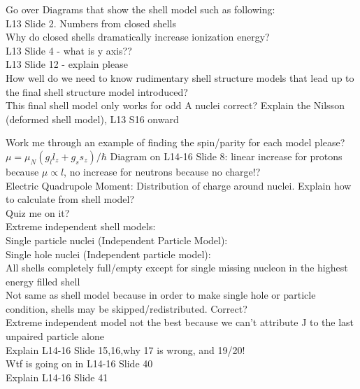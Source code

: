 \documentclass{article}
\begin{document}
\begin{multicols}{3}
Go over Diagrams that show the shell model such as following:\\
\hspace*{0.01\textwidth} L13 Slide 2.  Numbers from closed shells\\
\hspace*{0.01\textwidth} Why do closed shells dramatically increase ionization energy?\\
\hspace*{0.01\textwidth} L13 Slide 4 - what is y axis?? \\
\hspace*{0.01\textwidth} L13 Slide 12 - explain please\\
\hspace*{0.01\textwidth} How well do we need to know rudimentary shell structure models that lead up to the final shell structure model introduced?\\
\hspace*{0.01\textwidth} This final shell model only works for odd A nuclei correct?
\hspace*{0.01\textwidth} Explain the Nilsson (deformed shell model), L13 S16 onward\

Work me through an example of finding the spin/parity for each model please?\\

$\mu = \mu_{N}(g_{l}l_{z} + g_{s}s_{z}) / \hbar$
Diagram on L14-16 Slide 8: linear increase for protons because $\mu \propto l$, no increase for neutrons because no charge!?\\
Electric Quadrupole Moment: Distribution of charge around nuclei.  Explain how to calculate from shell model?\\

Quiz me on it?\\

Extreme independent shell models:\\
Single particle nuclei (Independent Particle Model):\\
\hspace*{0.01\textwidth} 
Single hole nuclei (Independent particle model):\\
\hspace*{0.01\textwidth} All shells completely full/empty except for single missing nucleon in the highest energy filled shell\\
\hspace*{0.01\textwidth} Not same as shell model because in order to make single hole or particle condition, shells may be skipped/redistributed.  Correct?\\
Extreme independent model not the best because we can't attribute J to the last unpaired particle alone\\
Explain L14-16 Slide 15,16,why 17 is wrong, and 19/20!\\
Wtf is going on in L14-16 Slide 40\\
Explain L14-16 Slide 41\\


\end{multicols}
\end{document}
